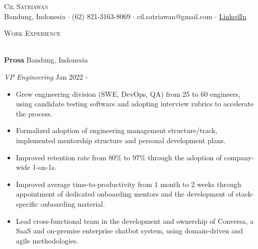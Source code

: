 \documentclass{article}
\newcommand{\lineunder} {
    \vspace*{-8pt} \\
    \hspace*{-18pt} \hrulefill \\
}
\newcommand{\header} [1] {
    {\hspace*{-18pt}\vspace*{6pt} \textsc{#1}}
    \vspace*{-6pt} \lineunder
}
\begin{document}
\vspace*{-40pt}

    

\vspace*{-15pt}
\begin{center}
	{\huge \scshape {Cil Satriawan}}\\
\vspace{1mm}
	Bandung, Indonesia $\cdot$ (62) 821-3163-8069 $\cdot$ cil.satriawan@gmail.com 
        $\cdot$ \href{https://www.linkedin.com/in/cil-satriawan-a60601111}{LinkedIn}\\
\end{center}
\vspace{-1mm}

\header{Work Experience}
\vspace{1mm}

\textbf{Prosa} \hfill Bandung, Indonesia\\
\vspace{1mm}

\emph{VP Engineering} \hfill Jan 2022 -\\
\vspace{-3mm}
\begin{itemize}[align=left, left=0pt..1em, itemsep=-2pt]
  \item Grew engineering division (SWE, DevOps, QA) from 25 to 60 engineers,
    using candidate testing software and adopting interview rubrics to
    accelerate the process.
  \item Formalized adoption of engineering management structure/track,
    implemented mentorship structure and personal development plans.
  \item Improved retention rate from 80\% to 97\% through the adoption of
    company-wide 1-on-1s.
  \item Improved average time-to-productivity from 1 month to 2 weeks through
    appointment of dedicated onboarding mentors and the development of
    stack-specific onboarding material.
  \item Lead cross-functional team in the development and ownership of
    Conversa, a SaaS and on-premise enterprise chatbot system, using
    domain-driven and agile methodologies.
\end{itemize}
\vspace{-2mm}
\end{document}
